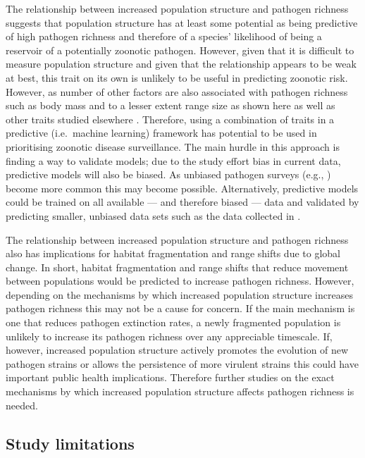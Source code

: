 The relationship between increased population structure and pathogen richness suggests that population structure has at least some potential as being predictive of high pathogen richness and therefore of a species' likelihood of being a reservoir of a potentially zoonotic pathogen. 
However, given that it is difficult to measure population structure and given that the relationship appears to be weak at best, this trait on its own is unlikely to be useful in predicting zoonotic risk.
However, as number of other factors are also associated with pathogen richness such as body mass and to a lesser extent range size as shown here as well as other traits studied elsewhere \cite{turmelle2009correlates, luis2013comparison}.
Therefore, using a combination of traits in a predictive (i.e.\ machine learning) framework has potential to be used in prioritising zoonotic disease surveillance.
The main hurdle in this approach is finding a way to validate models; due to the study effort bias in current data, predictive models will also be biased.
As unbiased pathogen surveys (e.g., \textcite{anthony2013strategy}) become more common this may become possible.
Alternatively, predictive models could be trained on all available --- and therefore biased --- data and validated by predicting smaller, unbiased data sets such as the data collected in \textcite{maganga2014bat}.

The relationship between increased population structure and pathogen richness also has implications for habitat fragmentation and range shifts due to global change.
In short, habitat fragmentation and range shifts that reduce movement between populations would be predicted to increase pathogen richness.
However, depending on the mechanisms by which increased population structure increases pathogen richness this may not be a cause for concern.
If the main mechanism is one that reduces pathogen extinction rates, a newly fragmented population is unlikely to increase its pathogen richness over any appreciable timescale.
If, however, increased population structure actively promotes the evolution of new pathogen strains or allows the persistence of more virulent strains \cite{blackwood2013resolving, pons2014insights, plowright2011urban} this could have important public health implications.
Therefore further studies on the exact mechanisms by which increased population structure affects pathogen richness is needed. 


\subsection{Study limitations}

